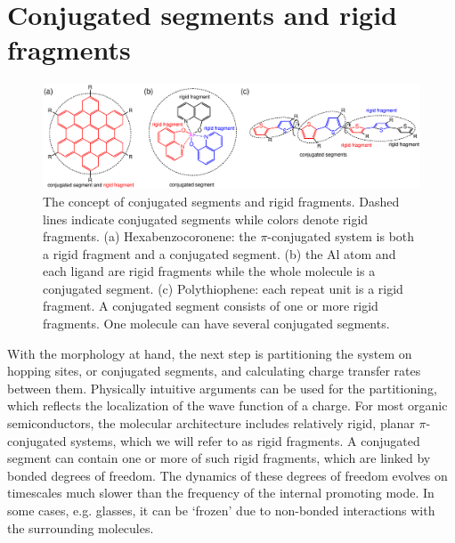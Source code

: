 \section{Conjugated segments and rigid fragments}
\label{sec:segments}

\begin{figure}
\includegraphics[width=\linewidth]{fig/conjugated_segment/fragment_segment}
\caption{The concept of conjugated segments and rigid fragments. Dashed lines 
indicate conjugated segments while colors denote rigid fragments. (a) 
Hexabenzocoronene: the $\pi$-conjugated system is both a rigid fragment and a 
conjugated segment. (b) the Al atom and each ligand are rigid fragments 
while the whole molecule is a conjugated segment. (c) Polythiophene: each repeat 
unit is a rigid fragment. A conjugated segment consists of one or more rigid 
fragments. One molecule can have several conjugated segments.}
\label{fig:segment}
\end{figure}

With the morphology at hand, the next step is partitioning the system on hopping 
sites, or conjugated segments, and 
calculating charge transfer rates between them. Physically intuitive arguments 
can be used for the partitioning,  which reflects the localization of the wave 
function of a charge. For most organic semiconductors, the molecular 
architecture includes relatively rigid, planar $\pi$-conjugated systems, which 
we will refer to as rigid fragments. A conjugated segment can contain one or 
more of such rigid fragments, which are linked by bonded degrees of freedom. The 
dynamics of these degrees of freedom evolves on timescales much slower than the 
frequency of the internal promoting mode. In some cases, e.g. glasses, it can be 
`frozen' due to non-bonded interactions with the surrounding molecules.

